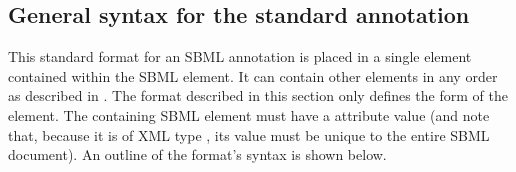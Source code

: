 \subsection{General syntax for the standard annotation}
\label{sec:general-syntax}

This standard format for an SBML annotation is placed in a single
 element contained within the SBML
 element.  It can contain other elements in any
order as described in .  The
format described in this section only defines the form of the
 element.  The containing SBML \SBase element must
have a  attribute value (and note that, because it
is of XML type , its value must be unique to the
entire SBML document).  An outline of the format's syntax is shown
below.

\newcommand{\sbmlElementNS}    {\colorbox[gray]{.4}{\texttt{\color{white}{SBML\_ELEMENT}}}}
\newcommand{\sbmlElement}      {\sbmlElementNS\xspace}
\newcommand{\otherContentNS}   {\colorbox[rgb]{.82,.9,.82}{\texttt{+++}}}
\newcommand{\otherContent}     {\otherContentNS\xspace}
\newcommand{\otherContentTall} {{\setlength{\fboxsep}{3.5pt}{\scalefont{1.2}\otherContent}}}
\newcommand{\moreOfTheSameNS}  {\colorbox[rgb]{.95,.8,.8}{\texttt{...}}}
\newcommand{\moreOfTheSame}    {\moreOfTheSameNS\xspace}
\newcommand{\relationElementNS}{\texttt{\textsl{RELATION\_ELEMENT}}}
\newcommand{\relationElement}  {\relationElementNS\xspace}
\newcommand{\sbmlMetaNS}       {\underline{\texttt{SBML\_META\_ID}}}
\newcommand{\sbmlMeta}         {\sbmlMetaNS\xspace}
\newcommand{\historyNS}        {\colorbox[gray]{.7}{\texttt{[HISTORY]}}}
\newcommand{\history}          {\historyNS\xspace}
\newcommand{\resourceURINS}    {\colorbox[rgb]{.8,.8,1}{\underline{\texttt{URI}}}}
\newcommand{\resourceURI}      {\resourceURINS\xspace}
\newcommand{\nestedContentNS}  {\colorbox[gray]{.7}{\texttt{[NESTED CONTENT]}}}
\newcommand{\nestedContent}    {\nestedContentNS\xspace}


